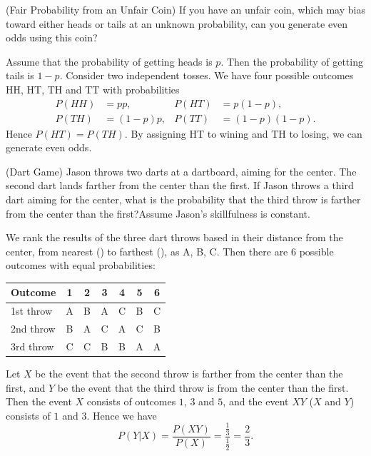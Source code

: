 \documentclass[12pt,letterpaper, onecolumn]{exam}
\begin{document}
\begin{questions}
    \question[](Fair Probability from an Unfair Coin) If you have an unfair coin, which may bias toward either heads or tails at an unknown probability, can you generate even odds using this coin?
    \begin{solution}
        Assume that the probability of getting heads is $p$. Then the probability of getting tails is $1-p$. Consider two independent tosses. We have four possible outcomes HH, HT, TH and TT with probabilities
        $$\begin{aligned}
            P(HH) &= pp,  & P(HT) &= p(1 - p), \\
            P(TH) &= (1 - p)p,  & P(TT) &= (1 - p)(1 - p).
        \end{aligned}$$
        Hence $P(HT)=P(TH)$. By assigning HT to wining and TH to losing, we can generate even odds.
    \end{solution}

    \question[](Dart Game) Jason throws two darts at a dartboard, aiming for the center. The second dart lands farther from the center than the first. If Jason throws a third dart aiming for the center, what is the probability that the third throw is farther from the center than the first?Assume Jason's skillfulness is constant.
    \begin{solution}        
        We rank the results of the three dart throws based in their distance from the center, from nearest () to farthest (), as A, B, C. Then there are $6$ possible outcomes with equal probabilities:
            \begin{table}[H]
            \centering
            \begin{tabular}{lcccccc}
                \toprule
                Outcome & 1 & 2 & 3 & 4 & 5 & 6 \\
                \midrule
                1st throw & A & B & A & C & B & C \\
                2nd throw & B & A & C & A & C & B \\
                3rd throw & C & C & B & B & A & A \\
                \bottomrule
            \end{tabular}
        \end{table}
            Let $X$ be the event that the second throw is farther from the center than the first, and $Y$ be the event that the third throw is  from the center than the first. Then the event $X$ consists of outcomes $1$, $3$ and $5$, and the event $XY$ ($X$ and $Y$) consists of $1$ and $3$. Hence we have 
            $$P(Y|X)=\frac{P(XY)}{P(X)}=\frac{\frac{1}{3}}{\frac{1}{2}}=\frac{2}{3}.$$
    \end{solution}


\end{questions}
\end{document}
